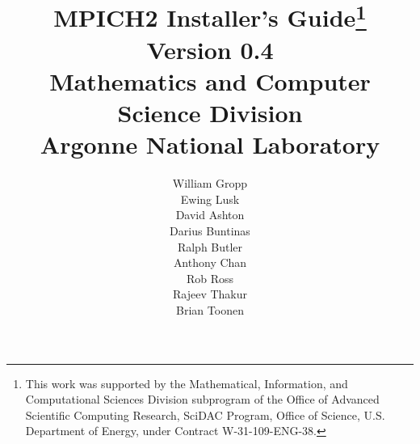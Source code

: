 \documentclass[dvipdfm,11pt]{article}
\begin{document}
\title{MPICH2 Installer's Guide\thanks{This work was supported by the
    Mathematical, Information, and Computational Sciences Division
    subprogram of the Office of Advanced Scientific Computing Research,
    SciDAC Program, Office of Science, U.S. Department of Energy, under
    Contract
    W-31-109-ENG-38.}\\
  Version 0.4\\
  Mathematics and Computer Science Division\\
  Argonne National Laboratory}

\author{William Gropp\\
Ewing Lusk\\
David Ashton\\
Darius Buntinas\\
Ralph Butler\\
Anthony Chan\\
Rob Ross\\
Rajeev Thakur\\
Brian Toonen}

\maketitle
\cleardoublepage

\tableofcontents
\clearpage

\pagestyle{headings}


\end{document}
